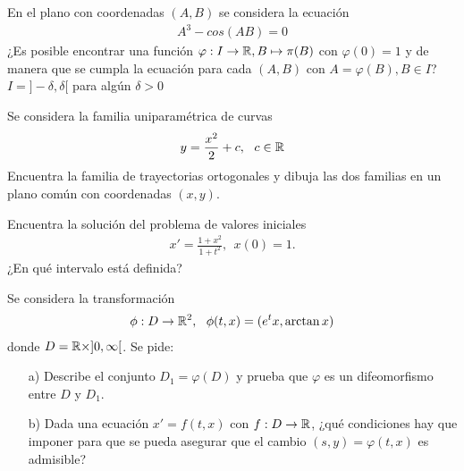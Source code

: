 \documentclass[12pt]{book}
\begin{document}
    \portada[%
        titulo=Ecuaciones Diferenciales I,
        subtitulo=Primera Prueba de Clase,
        autor=Jesús Muñoz Velasco,
        año=Curso 2024-2025]

    \begin{ejercicio}
        En el plano con coordenadas $(A,B)$ se considera la ecuación
        \begin{gather*}
            A^3-cos(AB)=0
        \end{gather*}
        ¿Es posible encontrar una función $\varphi:I \to \mathbb{R},B \mapsto \pi(B)$ con $\varphi(0)=1$ y de manera que se cumpla la ecuación para cada $(A,B)$ con $A=\varphi(B), B\in I$? $I=]-\delta, \delta[$ para algún $\delta>0$
    \end{ejercicio}

    \begin{ejercicio}
        Se considera la familia uniparamétrica de curvas
        \begin{gather*}
            y = \frac{x^2}{2}+c,\ \ c\in \mathbb{R}
        \end{gather*}
        Encuentra la familia de trayectorias ortogonales y dibuja las dos familias en un plano común con coordenadas $(x,y)$.
    \end{ejercicio}

    \begin{ejercicio}
        Encuentra la solución del problema de valores iniciales 
        \begin{gather*}
            x'=\frac{1+x^2}{1+t^2},\ \ x(0)=1.
        \end{gather*}
        ¿En qué intervalo está definida?
    \end{ejercicio}
    \begin{ejercicio}
        Se considera la transformación
        \begin{gather*}
            \phi:D \to \mathbb{R}^2,\ \ \phi(t,x)=(e^tx, \arctan x)
        \end{gather*}
        donde $D=\mathbb{R}\times ]0,\infty[$. Se pide:
        \begin{enumerate}
            \item[a)] Describe el conjunto $D_1=\varphi(D)$ y prueba que $\varphi$ es un difeomorfismo entre $D$ y $D_1$.
            \item[b)] Dada una ecuación $x'=f(t,x)$ con $f:D \to \mathbb{R}$, ¿qué condiciones hay que imponer para que se pueda asegurar que el cambio $(s,y)=\varphi(t,x)$ es admisible?
        \end{enumerate}
    \end{ejercicio}
\end{document}
